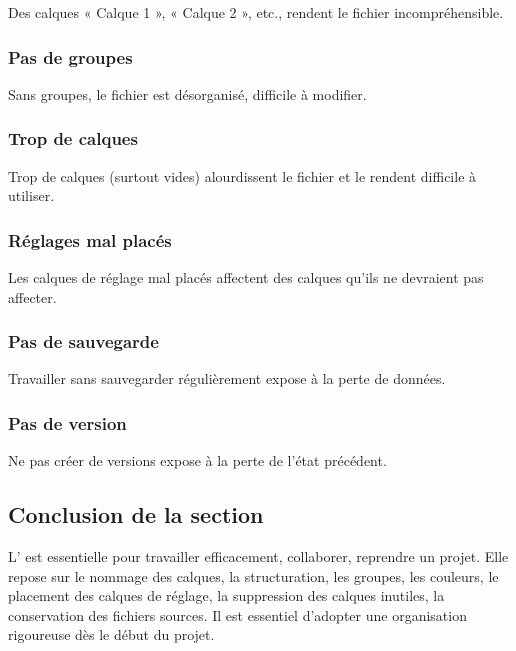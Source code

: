 Des calques « Calque 1 », « Calque 2 », etc., rendent le fichier incompréhensible.

\subsubsection{Pas de groupes}

Sans groupes, le fichier est désorganisé, difficile à modifier.

\subsubsection{Trop de calques}

Trop de calques (surtout vides) alourdissent le fichier et le rendent difficile à utiliser.

\subsubsection{Réglages mal placés}

Les calques de réglage mal placés affectent des calques qu'ils ne devraient pas affecter.

\subsubsection{Pas de sauvegarde}

Travailler sans sauvegarder régulièrement expose à la perte de données.

\subsubsection{Pas de version}

Ne pas créer de versions expose à la perte de l'état précédent.

\subsection*{Conclusion de la section}

L' est essentielle pour travailler efficacement, collaborer, reprendre un projet. Elle repose sur le nommage des calques, la structuration, les groupes, les couleurs, le placement des calques de réglage, la suppression des calques inutiles, la conservation des fichiers sources. Il est essentiel d'adopter une organisation rigoureuse dès le début du projet.

